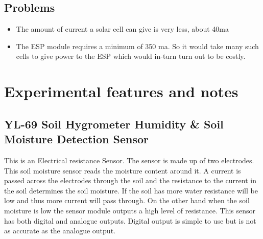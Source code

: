 \documentclass[16pt]{article}
\begin{document}
\vspace{0.3cm}

\subsection{Problems}

\begin{itemize}

\item
  The amount of current a solar cell can give is very less, about 40ma
\item
  The ESP module requires a minimum of 350 ma. So it would take many
  such cells to give power to the ESP which would in-turn turn out to be
  costly.
\end{itemize}

\vspace{10.5cm}

\vspace{19cm}
\section{Experimental features and notes}

\vspace{0.5cm}



\subsection{YL-69 Soil Hygrometer Humidity \& Soil Moisture Detection Sensor}


\vspace{0.3cm}
This is an Electrical resistance Sensor. The sensor is made up of two
electrodes. This soil moisture sensor reads the moisture content around
it. A current is passed across the electrodes through the soil and the
resistance to the current in the soil determines the soil moisture. If
the soil has more water resistance will be low and thus more current
will pass through. On the other hand when the soil moisture is low the
sensor module outputs a high level of resistance. This sensor has both
digital and analogue outputs. Digital output is simple to use but is not
as accurate as the analogue output.
\end{document}
